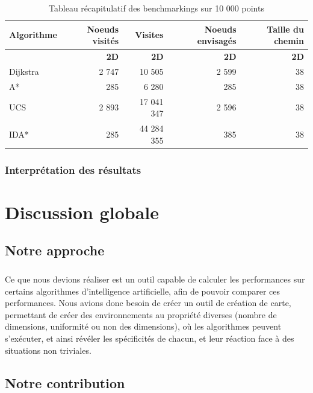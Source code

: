 \documentclass[pidr]{tnreport}
\begin{document}
\begin{table}[H]
\begin{center}
   \begin{tabular}{| l || r || r || r || r ||}
     \hline
      \textbf{Algorithme} & \textbf{Noeuds visités} & \textbf{Visites} & \textbf{Noeuds envisagés} & \textbf{Taille du chemin} \\
     \hline
     \cline{2-5}
    & \textbf{2D} & \textbf{2D} & \textbf{2D} & \textbf{2D} \\ \hline
     Dijkstra &  2 747 & 10 505 & 2 599 & 38  \\ \hline
     A* & 285 & 6 280 & 285 & 38   \\ \hline
      UCS & 2 893 & 17 041 347 & 2 596 & 38   \\ \hline
      IDA* & 285 & 44 284 355 & 385 & 38  \\ \hline
   \end{tabular}
 \end{center}
 \caption{Tableau récapitulatif des benchmarkings sur 10 000 points \label{bench_10000}}
\end{table}
		
		\subsection{Interprétation des résultats}

\chapter{Discussion globale}

\section{Notre approche}
\paragraph{}
Ce que nous devions réaliser est un outil capable de calculer les performances sur certains algorithmes d'intelligence artificielle, afin de pouvoir comparer ces performances. Nous avions donc besoin de créer un outil de création de carte, permettant de créer des environnements au propriété diverses (nombre de dimensions, uniformité ou non des dimensions), où les algorithmes peuvent s'exécuter, et ainsi révéler les spécificités de chacun, et leur réaction face à des situations non triviales.  

\section{Notre contribution}
\end{document}
